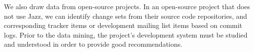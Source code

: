 We also draw data from open-source projects. 
In an open-source project that does not use Jazz, we can identify change sets from their source code repositories, and corresponding tracker items or development mailing list items based on commit logs. 
Prior to the data mining, the project's development system must be studied and understood in order to provide good recommendations.



